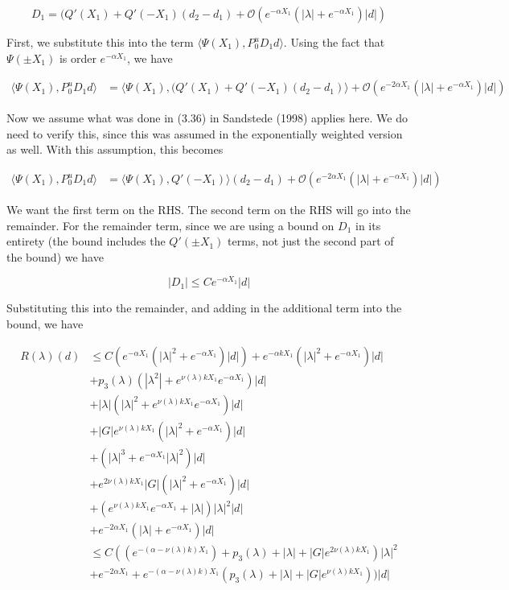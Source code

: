 \documentclass[12pt]{article}
\begin{document}
\begin{enumerate}
\[
D_1 = ( Q'(X_1) + Q'(-X_1 )(d_2 - d_1) + \mathcal{O} \left( e^{-\alpha X_1} \left( |\lambda| +  e^{-\alpha X_1}  \right) |d| \right)
\]

First, we substitute this into the term $\langle \Psi(X_1), P^u_0 D_1 d \rangle$. Using the fact that $\Psi(\pm X_1)$ is order $e^{-\alpha X_1}$, we have

\begin{align*}
\langle \Psi(X_1), P^u_0 D_1 d \rangle &= \langle \Psi(X_1), (Q'(X_1) + Q'(-X_1 )(d_2 - d_1 ) \rangle + \mathcal{O} \left( e^{-2 \alpha X_1} \left( |\lambda| +  e^{-\alpha X_1}  \right) |d| \right)
\end{align*}

Now we assume what was done in (3.36) in Sandstede (1998) applies here. We do need to verify this, since this was assumed in the exponentially weighted version as well. With this assumption, this becomes

\begin{align*}
\langle \Psi(X_1), P^u_0 D_1 d \rangle &= \langle \Psi(X_1), Q'(-X_1) \rangle (d_2 - d_1 ) + \mathcal{O} \left( e^{-2 \alpha X_1} \left( |\lambda| +  e^{-\alpha X_1}  \right) |d| \right)
\end{align*}

We want the first term on the RHS. The second term on the RHS will go into the remainder. For the remainder term, since we are using a bound on $D_1$ in its entirety (the bound includes the $Q'(\pm X_1)$ terms, not just the second part of the bound) we have

\[
|D_1| \leq C e^{-\alpha X_1}|d|
\]

Substituting this into the remainder, and adding in the additional term into the bound, we have

\begin{align*}
R(\lambda)(d) &\leq C( e^{-\alpha X_1}( |\lambda|^2 + e^{-\alpha X_1})|d|) + e^{-\alpha k X_1} ( |\lambda|^2 + e^{-\alpha X_1}) |d| \\
&+ p_3(\lambda) (|\lambda^2| + e^{\nu(\lambda)k X_1}e^{-\alpha X_1})|d| \\
&+ |\lambda| (|\lambda|^2 + e^{\nu(\lambda)k X_1} e^{-\alpha X_1})|d| \\
&+ |G| e^{\nu(\lambda)k X_1} ( |\lambda|^2 + e^{-\alpha X_1} )|d| \\ 
&+ (|\lambda|^3 + e^{-\alpha X_1} |\lambda|^2 )|d| \\
&+ e^{2 \nu(\lambda) k X_1} |G| ( |\lambda|^2 + e^{-\alpha X_1} )|d| \\
&+ (e^{\nu(\lambda)k X_1} e^{-\alpha X_1} + |\lambda|)|\lambda|^2|d|\\
&+ e^{-2 \alpha X_1} \left( |\lambda| +  e^{-\alpha X_1}  \right) |d|\\
&\leq C( ( e^{-(\alpha - \nu(\lambda) k)X_1 }) + p_3(\lambda) + |\lambda| + |G|e^{2 \nu(\lambda) k X_1})|\lambda|^2 \\ 
&+ e^{-2 \alpha X_1} + e^{-(\alpha - \nu(\lambda) k)X_1 }(p_3(\lambda) + |\lambda| + |G| e^{\nu(\lambda)k X_1}))|d|
\end{align*}


\end{enumerate}
\end{document}
